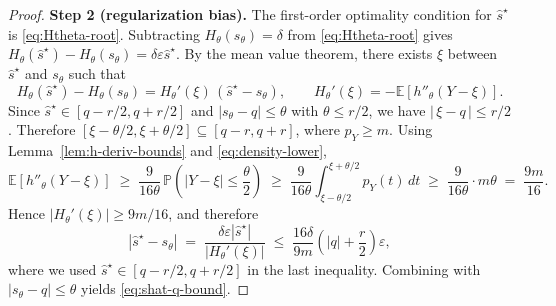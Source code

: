 \documentclass{uai2026} %
\theoremstyle{plain}
\theoremstyle{definition}
\begin{document}
\begin{proof}
\textbf{Step 2 (regularization bias).}
The first-order optimality condition for $\widehat s^\star$ is \eqref{eq:Htheta-root}.
Subtracting $H_\theta(s_\theta)=\delta$ from \eqref{eq:Htheta-root} gives
$H_\theta(\widehat s^\star)-H_\theta(s_\theta)=\delta\varepsilon \widehat s^\star$.
By the mean value theorem, there exists $\xi$ between $\widehat s^\star$ and $s_\theta$ such that
\[
  H_\theta(\widehat s^\star)-H_\theta(s_\theta)=H_\theta'(\xi)\,(\widehat s^\star-s_\theta),
  \qquad
  H_\theta'(\xi)=-\mathbb{E}\!\left[h''_\theta(Y-\xi)\right].
\]
Since $\widehat s^\star\in[q-r/2,q+r/2]$ and $|s_\theta-q|\le \theta$ with $\theta\le r/2$, we have $|\,\xi-q\,|\le r/2$.
Therefore $[\xi-\theta/2,\xi+\theta/2]\subseteq[q-r,q+r]$, where $p_Y\ge m$.
Using Lemma~\ref{lem:h-deriv-bounds} and \eqref{eq:density-lower},
\[
  \mathbb{E}[h''_\theta(Y-\xi)]
  \;\ge\;
  \frac{9}{16\theta}\,\mathbb{P}\!\left(|Y-\xi|\le \frac{\theta}{2}\right)
  \;\ge\;
  \frac{9}{16\theta}\int_{\xi-\theta/2}^{\xi+\theta/2} p_Y(t)\,dt
  \;\ge\;
  \frac{9}{16\theta}\cdot m\theta
  \;=\;\frac{9m}{16}.
\]
Hence $|H_\theta'(\xi)|\ge 9m/16$, and therefore
\[
  |\widehat s^\star-s_\theta|
  \;=\;
  \frac{\delta\varepsilon|\widehat s^\star|}{|H_\theta'(\xi)|}
  \;\le\;
  \frac{16\delta}{9m}\left(|q|+\frac{r}{2}\right)\varepsilon,
\]
where we used $\widehat s^\star\in[q-r/2,q+r/2]$ in the last inequality.
Combining with $|s_\theta-q|\le \theta$ yields \eqref{eq:shat-q-bound}.
\end{proof}
\end{document}
